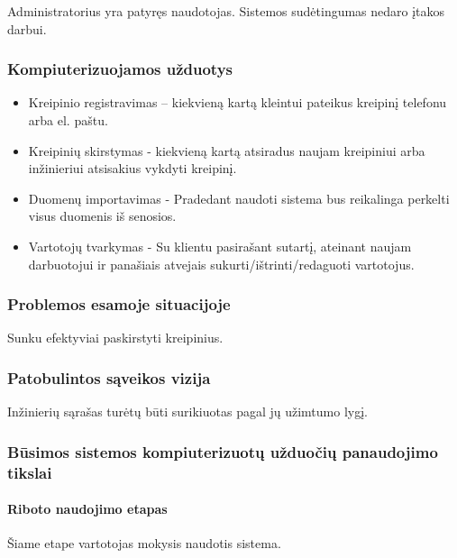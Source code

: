 		Administratorius yra patyręs naudotojas. Sistemos sudėtingumas nedaro įtakos darbui.

		
		\subsubsection{Kompiuterizuojamos užduotys}
		
		\begin{itemize}
			\item Kreipinio registravimas – kiekvieną kartą kleintui pateikus kreipinį telefonu arba el. paštu.
			\item Kreipinių skirstymas - kiekvieną kartą atsiradus naujam kreipiniui arba inžinieriui atsisakius vykdyti kreipinį.
			\item Duomenų importavimas - Pradedant naudoti sistema bus reikalinga perkelti visus duomenis iš senosios.
			\item Vartotojų tvarkymas - Su klientu pasirašant sutartį, ateinant naujam darbuotojui ir panašiais atvejais sukurti/ištrinti/redaguoti vartotojus.
		\end{itemize}

		
		\subsubsection{Problemos esamoje situacijoje}
		
		Sunku efektyviai paskirstyti kreipinius.

		
		\subsubsection{Patobulintos sąveikos vizija}
		
		Inžinierių sąrašas turėtų būti surikiuotas pagal jų užimtumo lygį.
		
		\subsubsection{Būsimos sistemos kompiuterizuotų užduočių panaudojimo tikslai}
		
			\setcounter{tocdepth}{5} \setcounter{secnumdepth}{5}
			
			\paragraph{Riboto naudojimo etapas}
			
			Šiame etape vartotojas mokysis naudotis sistema.
			
